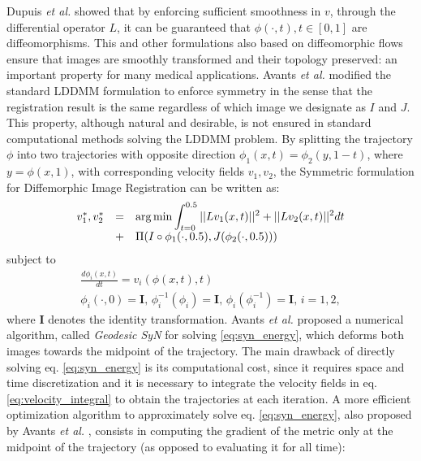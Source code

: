 Dupuis {\it et al.} \cite{Dupuis1998} showed that by enforcing sufficient smoothness in $v$, through the differential operator $L$, it can be guaranteed that $\phi(\cdot, t), t \in [0, 1]$ are diffeomorphisms. This and other formulations also based on diffeomorphic flows ensure that images are smoothly transformed and their topology preserved: an important property for many medical applications. Avants {\it et al.} \cite{Avants2008, Avants2011} modified the standard LDDMM formulation to enforce symmetry in the sense that the registration result is the same regardless of which image we designate as $I$ and $J$. This property, although natural and desirable, is not ensured in standard computational methods solving the LDDMM problem. By splitting the trajectory $\phi$ into two trajectories with opposite direction $\phi_{1}(x, t) = \phi_{2}(y, 1-t)$, where $y = \phi(x, 1)$, with corresponding velocity fields $v_{1}, v_{2}$, the Symmetric formulation for Diffemorphic Image Registration \citep{Avants2008, Avants2011} can be written as:
\begin{equation}\label{eq:syn_energy}
    \begin{array}{lll}
        v_{1}^{*}, v_{2}^{*} &=& \mathlarger{\arg \min \int_{t=0}^{0.5} ||L v_{1}(x, t)||^{2} + ||L v_{2}(x, t)||^{2} dt}\\
        &+& \mathlarger{ \Pi(I \circ \phi_{1}(\cdot, 0.5), J(\phi_{2}(\cdot, 0.5)))}
    \end{array}
\end{equation}
subject to
\begin{equation}\label{eq:syn_energy_constraints}
    \begin{array}{l}
        \frac{d\phi_{i}(x, t)}{dt} = v_{i}(\phi(x,t),t)\\
        \phi_{i}(\cdot, 0) = \mathbf{I},\, \phi_{i}^{-1}(\phi_{i}) = \mathbf{I},\, \phi_{i}(\phi_{i}^{-1}) = \mathbf{I},\, i=1,2,
    \end{array}
\end{equation}
where $\mathbf{I}$ denotes the identity transformation. Avants {\it et al.} \cite{Avants2006} proposed a numerical algorithm, called \textit{Geodesic SyN} for solving \eqref{eq:syn_energy}, which deforms both images towards the midpoint of the trajectory. The main drawback of directly solving eq. \eqref{eq:syn_energy} is its computational cost, since it requires space and time discretization and it is necessary to integrate the velocity fields in eq. \eqref{eq:velocity_integral} to obtain the trajectories at each iteration. A more efficient optimization algorithm to approximately solve eq. \eqref{eq:syn_energy}, also proposed by Avants {\it et al.} \cite{Avants2008, Avants2011}, consists in computing the gradient of the metric only at the midpoint of the trajectory (as opposed to evaluating it for all time):
